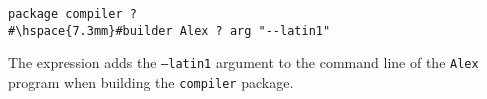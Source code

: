 \begin{lstlisting}
package compiler ?
#\hspace{7.3mm}#builder Alex ? arg "--latin1"
\end{lstlisting}

\noindent The expression adds the \texttt{--latin1} argument to the command line
of the \texttt{Alex} program when building the \texttt{compiler} package.

\newcommand{\itab}[1]{\hspace{0em}\rlap{#1}}
\newcommand{\tab}[1]{\hspace{.12\textwidth}\rlap{#1}}
\newcommand{\ctab}[1]{\hspace{.031\textwidth}\rlap{#1}}
\newcommand{\ptab}[1]{\hspace{.074\textwidth}\rlap{#1}}
\newcommand{\cotab}[1]{\hspace{.064\textwidth}\rlap{#1}}
\newcommand{\ttab}[1]{\hspace{.058\textwidth}\rlap{#1}}
\newcommand{\tytab}[1]{\hspace{.052\textwidth}\rlap{#1}}
\newcommand{\atab}[1]{\hspace{.102\textwidth}\rlap{#1}}

